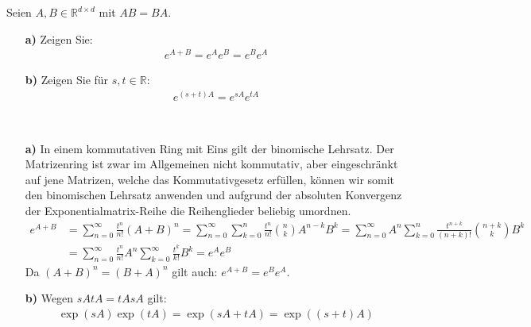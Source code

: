 \begin{exercise}
Seien $A,B \in \mathbb{R}^{d \times d}$ mit $AB = BA$.
\begin{itemize}
  \item [\textbf{a)}]Zeigen Sie:
  \begin{align*}
    e^{A + B} = e^Ae^B = e^Be^A
  \end{align*}
  \item [\textbf{b)}]Zeigen Sie für $s,t \in \mathbb{R}$:
  \begin{align*}
    e^{(s + t)A} = e^{sA}e^{tA}
  \end{align*}
\end{itemize}
\end{exercise}
\begin{solution}
\leavevmode \\
\begin{itemize}
  \item [\textbf{a)}]
  In einem kommutativen Ring mit Eins gilt der binomische Lehrsatz.
  Der Matrizenring ist zwar im Allgemeinen nicht kommutativ, aber eingeschränkt
  auf jene Matrizen, welche das Kommutativgesetz erfüllen, können wir somit
  den binomischen Lehrsatz anwenden und aufgrund der absoluten Konvergenz der Exponentialmatrix-Reihe
  die Reihenglieder beliebig umordnen.
  \begin{align*}
    e^{A + B} &= \sum_{n=0}^{\infty}\frac{t^n}{n!}(A + B)^n
    = \sum_{n=0}^{\infty}\sum_{k=0}^n\frac{t^n}{n!}\binom{n}{k}A^{n-k}B^k
    = \sum_{n=0}^{\infty}A^n
    \sum_{k=0}^{n}\frac{t^{n+k}}{(n+k)!}\binom{n+k}{k}B^k \\
    &= \sum_{n=0}^{\infty}\frac{t^n}{n!}A^n
    \sum_{k=0}^{\infty}\frac{t^{k}}{k!}B^k
    = e^Ae^B
  \end{align*}
  Da $(A + B)^n = (B + A)^n$ gilt auch: $e^{A + B} = e^Be^A$.
  \item [\textbf{b)}]
  Wegen $sAtA = tAsA$ gilt:
  \begin{align*}
    \exp(sA)\exp(tA) = \exp(sA + tA) = \exp((s+t)A)
  \end{align*}
\end{itemize}


\end{solution}
